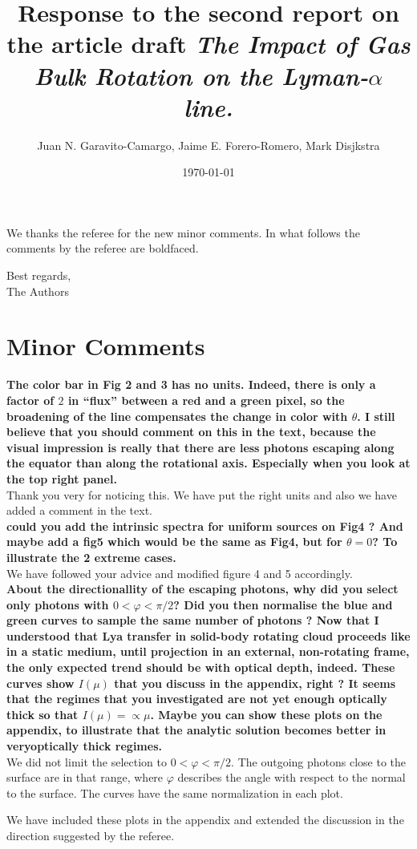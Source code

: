 \documentclass[12pt]{article}
\title{Response to the second report on the article draft \emph{The
    Impact of Gas Bulk Rotation on the Lyman-$\alpha$ line.}}
\author{Juan N. Garavito-Camargo, Jaime E. Forero-Romero, Mark Disjkstra}
\date{\today}
\begin{document}
\maketitle

We thanks the referee for the new minor comments. 
In what follows the comments by the referee are boldfaced.

Best regards, \\

The Authors\\

\section*{Minor Comments}

{\bf The color bar in Fig 2 and 3 has no units. Indeed, there is only a factor of $2$ in “flux” between a
red and a green pixel, so the broadening of the line compensates the change in color with $\theta$. I still
believe that you should comment on this in the text, because the visual impression is really that
there are less photons escaping along the equator than along the rotational axis. Especially when
you look at the top right panel.}\\

Thank you very for noticing this. We have put the right units and also we have added a comment in the text.\\ 

{\bf could you add the intrinsic spectra for uniform sources on Fig4 ? And maybe add a fig5 which
would be the same as Fig4, but for $\theta = 0$? To illustrate the 2 extreme cases.}\\

We have followed your advice and modified figure 4 and 5 accordingly.\\

{\bf About the directionallity of the escaping photons, why did you select only photons with $0 < \varphi < \pi/2$? Did you then normalise the blue and green curves to sample the same number of photons ? Now that I understood that Lya transfer in solid-body rotating cloud proceeds like in a static medium, until projection in an external, non-rotating frame, the only expected trend should be with optical depth, indeed. These curves show $I(\mu)$ that you discuss in the appendix, right ? It seems that the regimes that you investigated are not yet enough optically thick so that $I(\mu) = \propto \mu$. Maybe you can show these plots on the appendix, to illustrate that the analytic solution becomes better in veryoptically thick regimes.}\\

We did not limit the selection to $0 < \varphi < \pi/2$. The outgoing
photons close to the surface are in that range, where $\varphi$
describes the angle with respect to the normal to the surface.  The
curves have the same normalization in each plot.  

We have included these plots in the appendix and extended the
discussion in the direction suggested by the referee. 
\end{document}
